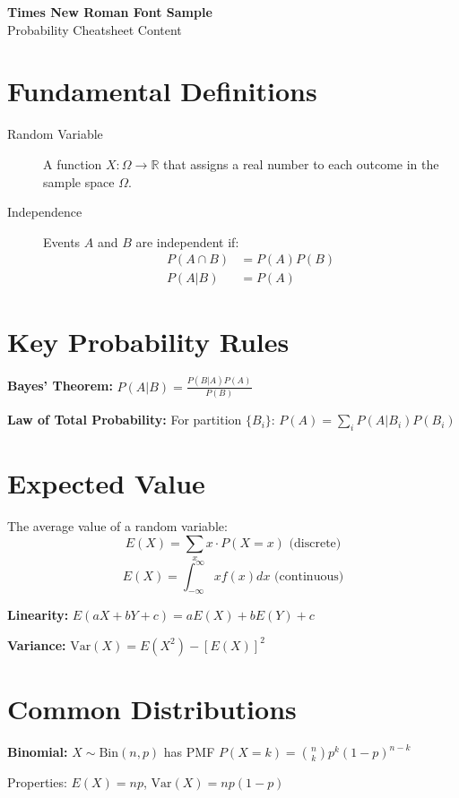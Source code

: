 \documentclass[10pt]{article}
\newcommand{\var}{\textrm{Var}}
\newcommand{\Bin}{\textrm{Bin}}
\begin{document}
\begin{center}
{\Large\bfseries Times New Roman Font Sample}\\
{\large Probability Cheatsheet Content}
\end{center}

\vspace{0.5cm}

\section{Fundamental Definitions}
\begin{description}
    \item[Random Variable] A function $X: \Omega \to \mathbb{R}$ that assigns a real number to each outcome in the sample space $\Omega$.
    \item[Independence] Events $A$ and $B$ are independent if:
    \begin{align*}
        P(A \cap B) &= P(A)P(B) \\
        P(A|B) &= P(A)
    \end{align*}
\end{description}

\section{Key Probability Rules}
\textbf{Bayes' Theorem:} $P(A|B) = \frac{P(B|A)P(A)}{P(B)}$

\textbf{Law of Total Probability:} For partition $\{B_i\}$: $P(A) = \sum_{i} P(A|B_i)P(B_i)$

\section{Expected Value}
The average value of a random variable:
\[E(X) = \sum_{x} x \cdot P(X = x) \text{ (discrete)}\]
\[E(X) = \int_{-\infty}^{\infty} x f(x) dx \text{ (continuous)}\]

\textbf{Linearity:} $E(aX + bY + c) = aE(X) + bE(Y) + c$

\textbf{Variance:} $\var(X) = E(X^2) - [E(X)]^2$

\section{Common Distributions}
\textbf{Binomial:} $X \sim \Bin(n, p)$ has PMF $P(X = k) = \binom{n}{k} p^k (1-p)^{n-k}$

Properties: $E(X) = np$, $\var(X) = np(1-p)$
\end{document}
